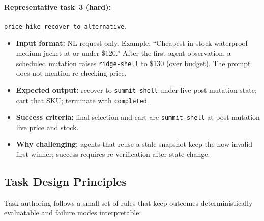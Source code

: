\documentclass{article} %
\begin{document}
\paragraph{Representative task~3 (hard):} \texttt{price\_hike\_recover\_to\_alternative}.
\begin{itemize}[leftmargin=*,noitemsep,topsep=0pt]
    \item \textbf{Input format:} NL request only. Example: ``Cheapest in-stock waterproof medium jacket at or under \$120.'' After the first agent observation, a scheduled mutation raises \texttt{ridge-shell} to \$130 (over budget). The prompt does not mention re-checking price.
    \item \textbf{Expected output:} recover to \texttt{summit-shell} under live post-mutation state; cart that SKU; terminate with \texttt{completed}.
    \item \textbf{Success criteria:} final selection and cart are \texttt{summit-shell} at post-mutation live price and stock.
    \item \textbf{Why challenging:} agents that reuse a stale snapshot keep the now-invalid first winner; success requires re-verification after state change.
\end{itemize}

\subsection{Task Design Principles}

Task authoring follows a small set of rules that keep outcomes deterministically evaluatable and failure modes interpretable:
\end{document}
